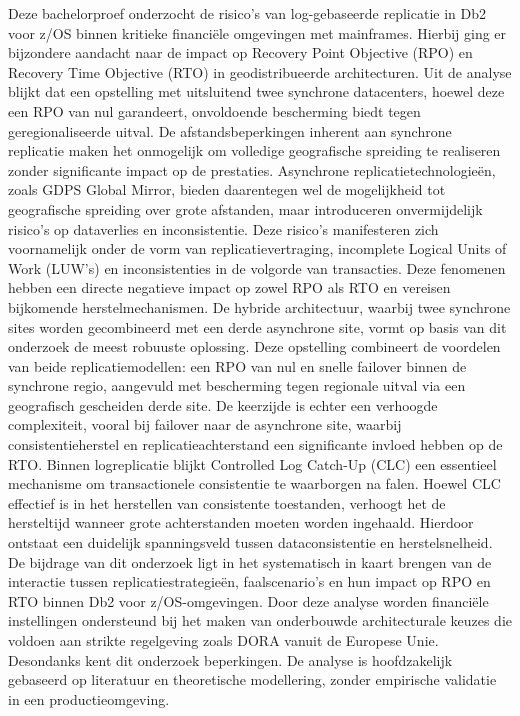 Deze bachelorproef onderzocht de risico's van log-gebaseerde replicatie in Db2 voor z/OS binnen kritieke financiële omgevingen met mainframes.
Hierbij ging er bijzondere aandacht naar de impact op Recovery Point Objective (RPO) en Recovery Time Objective (RTO) in geodistribueerde architecturen.
Uit de analyse blijkt dat een opstelling met uitsluitend twee synchrone datacenters, hoewel deze een RPO van nul garandeert, onvoldoende bescherming biedt tegen geregionaliseerde uitval. 
De afstandsbeperkingen inherent aan synchrone replicatie maken het onmogelijk om volledige geografische spreiding te realiseren zonder significante impact op de prestaties.
Asynchrone replicatietechnologieën, zoals GDPS Global Mirror, bieden daarentegen wel de mogelijkheid tot geografische spreiding over grote afstanden, maar introduceren onvermijdelijk risico's op dataverlies en inconsistentie. 
Deze risico's manifesteren zich voornamelijk onder de vorm van replicatievertraging, incomplete Logical Units of Work (LUW's) en inconsistenties in de volgorde van transacties. 
Deze fenomenen hebben een directe negatieve impact op zowel RPO als RTO en vereisen bijkomende herstelmechanismen.
De hybride architectuur, waarbij twee synchrone sites worden gecombineerd met een derde asynchrone site, vormt op basis van dit onderzoek de meest robuuste oplossing. 
Deze opstelling combineert de voordelen van beide replicatiemodellen: een RPO van nul en snelle failover binnen de synchrone regio, aangevuld met bescherming tegen regionale uitval via een geografisch gescheiden derde site. 
De keerzijde is echter een verhoogde complexiteit, vooral bij failover naar de asynchrone site, waarbij consistentieherstel en replicatieachterstand een significante invloed hebben op de RTO.
Binnen logreplicatie blijkt Controlled Log Catch-Up (CLC) een essentieel mechanisme om transactionele consistentie te waarborgen na falen. 
Hoewel CLC effectief is in het herstellen van consistente toestanden, verhoogt het de hersteltijd wanneer grote achterstanden moeten worden ingehaald. 
Hierdoor ontstaat een duidelijk spanningsveld tussen dataconsistentie en herstelsnelheid.
De bijdrage van dit onderzoek ligt in het systematisch in kaart brengen van de interactie tussen replicatiestrategieën, faalscenario's en hun impact op RPO en RTO binnen Db2 voor z/OS-omgevingen.
Door deze analyse worden financiële instellingen ondersteund bij het maken van onderbouwde architecturale keuzes die voldoen aan strikte regelgeving zoals DORA vanuit de Europese Unie.
Desondanks kent dit onderzoek beperkingen. 
De analyse is hoofdzakelijk gebaseerd op literatuur en theoretische modellering, zonder empirische validatie in een productieomgeving. 

